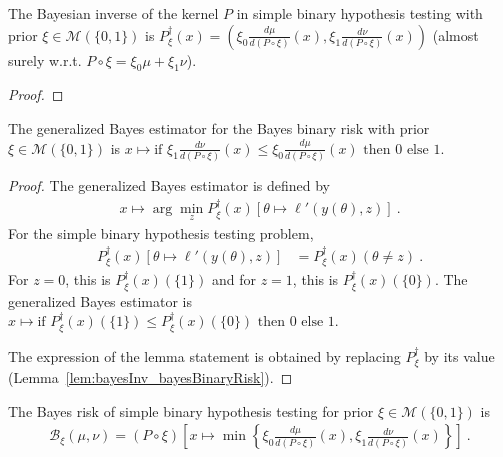 \begin{lemma}
  \label{lem:bayesInv_bayesBinaryRisk}
  The Bayesian inverse of the kernel $P$ in simple binary hypothesis testing with prior $\xi \in \mathcal M(\{0,1\})$ is $P_\xi^\dagger(x) = \left(\xi_0\frac{d \mu}{d(P \circ \xi)}(x), \xi_1\frac{d \nu}{d(P \circ \xi)}(x)\right)$ (almost surely w.r.t. $P \circ \xi = \xi_0 \mu + \xi_1 \nu$).
\end{lemma}

\begin{proof}%
{}

\end{proof}

\begin{lemma}
  \label{lem:genBayesEstimator_bayesBinaryRisk}
  The generalized Bayes estimator for the Bayes binary risk with prior $\xi \in \mathcal M(\{0,1\})$ is $x \mapsto \text{if } \xi_1\frac{d \nu}{d(P \circ \xi)}(x) \le \xi_0\frac{d \mu}{d(P \circ \xi)}(x) \text{ then } 0 \text{ else } 1$.
\end{lemma}

\begin{proof}%
{}
The generalized Bayes estimator is defined by
\begin{align*}
x \mapsto \arg\min_z P_\xi^\dagger(x)\left[\theta \mapsto \ell'(y(\theta), z)\right] \: .
\end{align*}
For the simple binary hypothesis testing problem,
\begin{align*}
P_\xi^\dagger(x)\left[\theta \mapsto \ell'(y(\theta), z)\right]
&= P_\xi^\dagger(x)(\theta \ne z)
\: .
\end{align*}
For $z = 0$, this is $P_\xi^\dagger(x)(\{1\})$ and for $z = 1$, this is $P_\xi^\dagger(x)(\{0\})$.
The generalized Bayes estimator is $x \mapsto \text{if } P_\xi^\dagger(x)(\{1\}) \le P_\xi^\dagger(x)(\{0\}) \text{ then } 0 \text{ else } 1$.

The expression of the lemma statement is obtained by replacing $P_\xi^\dagger$ by its value (Lemma~\ref{lem:bayesInv_bayesBinaryRisk}).
\end{proof}

\begin{theorem}
  \label{thm:bayesBinaryRisk_eq}
  The Bayes risk of simple binary hypothesis testing for prior $\xi \in \mathcal M(\{0,1\})$ is
  \begin{align*}
  \mathcal B_\xi(\mu, \nu) = (P \circ \xi)\left[x \mapsto \min \left\{\xi_0\frac{d \mu}{d(P \circ \xi)}(x), \xi_1\frac{d \nu}{d(P \circ \xi)}(x)\right\}\right]
  \: .
  \end{align*}
\end{theorem}

